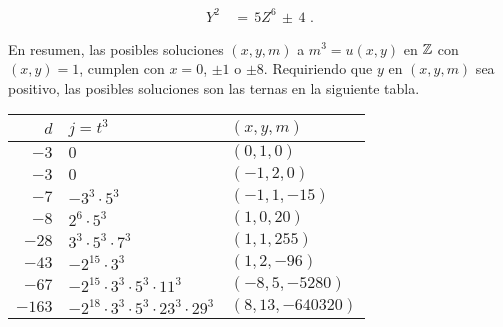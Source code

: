 \begin{align*}
 Y^{2} & \,=\,5Z^{6}\,\pm\,4\text{ .}
\end{align*}

En resumen, las posibles soluciones $(x,y,m)$ a $m^{3}=u(x,y)$ en $\mathbb{Z}$
con $(x,y)=1$, cumplen con $x=0$, $\pm 1$ o $\pm 8$. Requiriendo que $y$ en
$(x,y,m)$ sea positivo, las posibles soluciones son las ternas en la siguiente
tabla.

\begin{tabular}{r|l|l}
 $d$ & $j=t^{3}$ & $(x,y,m)$\\
\hline
 $-3$ & $0$ & $(0,1,0)$\\
 $-3$ & $0$ & $(-1,2,0)$\\
 $-7$ & $-3^{3}\cdot 5^{3}$ & $(-1,1,-15)$\\
 $-8$ & $2^{6}\cdot 5^{3}$%
	& $(1,0,20)$\\
 $-28$ & $3^{3}\cdot 5^{3}\cdot 7^{3}$%
	& $(1,1,255)$\\
 $-43$ & $-2^{15}\cdot 3^{3}$%
	& $(1,2,-96)$\\
 $-67$ & $-2^{15}\cdot 3^{3}\cdot 5^{3}\cdot 11^{3}$%
	& $(-8,5,-5280)$\\
 $-163$ & $-2^{18}\cdot 3^{3}\cdot 5^{3}\cdot 23^{3}\cdot 29^{3}$%
	& $(8,13,-640320)$
\end{tabular}



